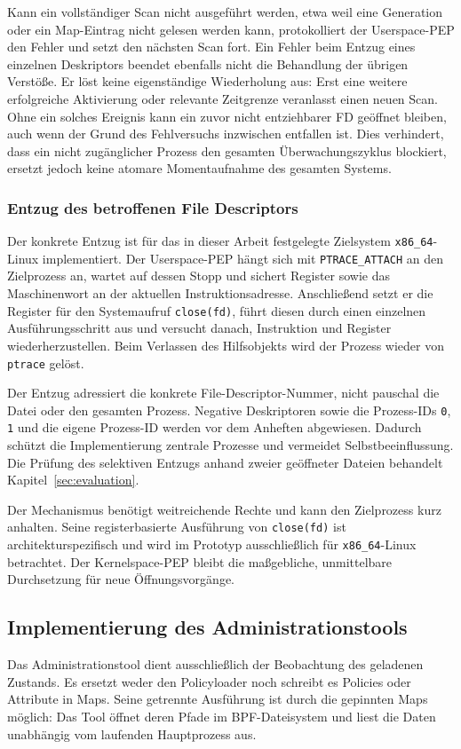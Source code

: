 Kann ein vollständiger Scan nicht ausgeführt werden, etwa weil eine Generation oder ein Map-Eintrag nicht gelesen werden kann, protokolliert der Userspace-PEP den Fehler und setzt den nächsten Scan fort. Ein Fehler beim Entzug eines einzelnen Deskriptors beendet ebenfalls nicht die Behandlung der übrigen Verstöße. Er löst keine eigenständige Wiederholung aus: Erst eine weitere erfolgreiche Aktivierung oder relevante Zeitgrenze veranlasst einen neuen Scan. Ohne ein solches Ereignis kann ein zuvor nicht entziehbarer FD geöffnet bleiben, auch wenn der Grund des Fehlversuchs inzwischen entfallen ist. Dies verhindert, dass ein nicht zugänglicher Prozess den gesamten Überwachungszyklus blockiert, ersetzt jedoch keine atomare Momentaufnahme des gesamten Systems.

\subsubsection{Entzug des betroffenen File Descriptors}\label{sec:fd-entzug-umsetzung}
Der konkrete Entzug ist für das in dieser Arbeit festgelegte Zielsystem \texttt{x86\_64}-Linux implementiert. Der Userspace-PEP hängt sich mit \texttt{PTRACE\_ATTACH} an den Zielprozess an, wartet auf dessen Stopp und sichert Register sowie das Maschinenwort an der aktuellen Instruktionsadresse. Anschließend setzt er die Register für den Systemaufruf \texttt{close(fd)}, führt diesen durch einen einzelnen Ausführungsschritt aus und versucht danach, Instruktion und Register wiederherzustellen. Beim Verlassen des Hilfsobjekts wird der Prozess wieder von \texttt{ptrace} gelöst.

Der Entzug adressiert die konkrete File-Descriptor-Nummer, nicht pauschal die Datei oder den gesamten Prozess. Negative Deskriptoren sowie die Prozess-IDs \texttt{0}, \texttt{1} und die eigene Prozess-ID werden vor dem Anheften abgewiesen. Dadurch schützt die Implementierung zentrale Prozesse und vermeidet Selbstbeeinflussung. Die Prüfung des selektiven Entzugs anhand zweier geöffneter Dateien behandelt Kapitel~\ref{sec:evaluation}.

Der Mechanismus benötigt weitreichende Rechte und kann den Zielprozess kurz anhalten. Seine registerbasierte Ausführung von \texttt{close(fd)} ist architekturspezifisch und wird im Prototyp ausschließlich für \texttt{x86\_64}-Linux betrachtet. Der Kernelspace-PEP bleibt die maßgebliche, unmittelbare Durchsetzung für neue Öffnungsvorgänge.

\subsection{Implementierung des Administrationstools}\label{sec:administration}
Das Administrationstool dient ausschließlich der Beobachtung des geladenen Zustands. Es ersetzt weder den Policyloader noch schreibt es Policies oder Attribute in Maps. Seine getrennte Ausführung ist durch die gepinnten Maps möglich: Das Tool öffnet deren Pfade im BPF-Dateisystem und liest die Daten unabhängig vom laufenden Hauptprozess aus.

